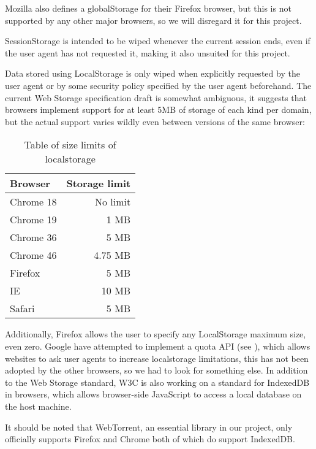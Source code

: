 Mozilla also defines a globalStorage for their Firefox browser, 
but this is not supported by any other major browsers, so we will disregard it for this project.

SessionStorage is intended to be wiped whenever the current session ends, 
even if the user agent has not requested it, making it also unsuited for this project.

Data stored using LocalStorage is only wiped when explicitly requested by the user agent or 
by some security policy specified by the user agent beforehand.
\newline\newline
The current Web Storage specification draft is somewhat ambiguous, 
it suggests that browsers implement support for at least 5MB of storage of each kind per domain,
but the actual support varies wildly even between versions of the same browser:

\begin{table}[H]
	\centering
	\begin{tabular}{l | r}
        Browser   & Storage limit \\ \hline
		Chrome 18 & No limit  \\
		Chrome 19 & 1    MB   \\
		Chrome 36 & 5    MB   \\
		Chrome 46 & 4.75 MB   \\
		Firefox   & 5    MB   \\
		IE        & 10   MB   \\
		Safari    & 5    MB   \\
	\end{tabular}
	\caption{Table of size limits of localstorage}
	\label{table:browserls}
\end{table}

Additionally, Firefox allows the user to specify any LocalStorage maximum size, even zero. 
Google have attempted to implement a quota \acs{API} (see \citep{QuotaAPI}), 
which allows websites to ask user agents to increase localstorage limitations,
this has not been adopted by the other browsers, so we had to look for something else.
\newline\newline
In addition to the Web Storage standard, W3C is also working on a standard for IndexedDB in browsers, 
which allows browser-side JavaScript to access a local database on the host machine.

It should be noted that WebTorrent, 
an essential library in our project, 
only officially supports Firefox and Chrome 
both of which do support IndexedDB.


